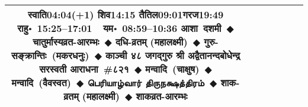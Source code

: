 \documentclass[a3paper,12pt,landscape]{article}
\newcommand{\eventsep}{~$\Diamondblack$ }
\newcommand{\To}{\hspace{1pt}\raisebox{0pt}{\tiny\RIGHTarrow}\hspace{1pt}}
\newcommand{\tamil}[1]{%
{\fontspec[Scale=0.9,FakeStretch=0.9]{Noto Sans Tamil} \footnotesize #1}}
\newcommand{\rahuyama}[2]{%
{राहु॰~\textsf{#1}~~यम॰~\textsf{#2}}
}
\begin{document}
\begin{center}
\begin{tabular}{|c|c|c|c|c|c|c|}
{{\mbox{स्वाति\To{}\textsf{04:04(+1)\hspace{2ex}}}}%
{\mbox{शिव\To{}\textsf{14:15\hspace{2ex}}}}%
{\mbox{तैतिल\To{}\textsf{09:01\hspace{2ex}}}\mbox{गरज\To{}\textsf{19:49\hspace{2ex}}}}}%
{\rahuyama{15:25--17:01}{08:59--10:36}}%
{आशा~दशमी\eventsep चातुर्मास्यव्रत-आरम्भः\eventsep दधि-व्रतम् (महालक्ष्मी)\eventsep गुरु-सङ्क्रान्तिः~(मकर\To{}धनुः)\eventsep काञ्ची ४८ जगद्गुरु श्री अद्वैतानन्दबोधेन्द्र सरस्वती आराधना~\#{८२१}\eventsep मन्वादि~(चाक्षुष)\eventsep मन्वादि~(वैवस्वत)\eventsep \tamil{பெரியாழ்வார் திருநக்ஷத்திரம்}\eventsep शाक-व्रतम् (महालक्ष्मी)\eventsep शाकव्रत-आरम्भः}
&
{}  &
{}  &
{}  &
\\ \hline
\end{tabular}




\end{center}
\end{document}
